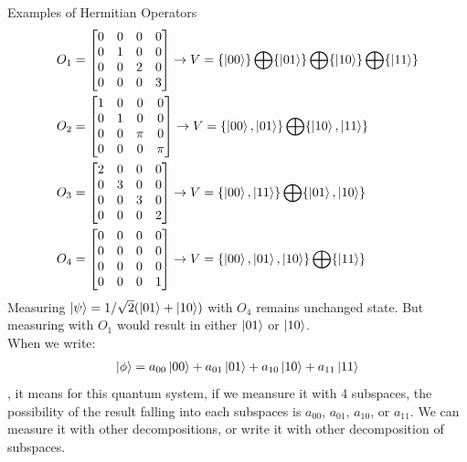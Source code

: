 \documentclass{beamer}
\begin{document}
\begin{frame}{Examples of Hermitian Operators}
  {\tiny
  \begin{align*}
    O_1 &= 
    \begin{bmatrix} 
      0 & 0 & 0 & 0 \\
      0 & 1 & 0 & 0 \\
      0 & 0 & 2 & 0 \\
      0 & 0 & 0 & 3
    \end{bmatrix}  \rightarrow
    V = \{\ket{00}\} \bigoplus \{\ket{01}\} \bigoplus \{\ket{10}\} \bigoplus \{\ket{11}\} \\
    O_2 &= 
    \begin{bmatrix} 
      1 & 0 & 0 & 0 \\
      0 & 1 & 0 & 0 \\
      0 & 0 & \pi & 0 \\
      0 & 0 & 0 & \pi 
    \end{bmatrix} \rightarrow
    V = \{\ket{00}, \ket{01}\} \bigoplus \{\ket{10}, \ket{11}\} \\
    O_3 &= 
    \begin{bmatrix} 
      2 & 0 & 0 & 0 \\
      0 & 3 & 0 & 0 \\
      0 & 0 & 3 & 0 \\
      0 & 0 & 0 & 2
    \end{bmatrix} \rightarrow
    V = \{\ket{00}, \ket{11}\} \bigoplus \{\ket{01}, \ket{10}\} \\
    O_4 &= 
    \begin{bmatrix} 
      0 & 0 & 0 & 0 \\
      0 & 0 & 0 & 0 \\
      0 & 0 & 0 & 0 \\
      0 & 0 & 0 & 1
    \end{bmatrix} \rightarrow
    V = \{\ket{00}, \ket{01}, \ket{10}\} \bigoplus \{\ket{11}\}
  \end{align*}
  Measuring $\ket{\psi} = 1/\sqrt2 (\ket{01}+\ket{10})$ with $O_4$ remains unchanged state.
  But measuring with $O_1$ would result in either $\ket{01}$ or $\ket{10}$. \\
  When we write:
  \begin{align*}
    \ket{\phi} = a_{00}\ket{00} + a_{01}\ket{01} + a_{10}\ket{10} + a_{11}\ket{11}
  \end{align*}
  , it means for this quantum system, if we meansure it with 4 subspaces, the possibility
  of the result falling into each subspaces is $a_{00}$, $a_{01}$, $a_{10}$, or $a_{11}$.
  We can measure it with other decompositions, or write it with other decomposition of subspaces.
  }%
\end{frame}
\end{document}
